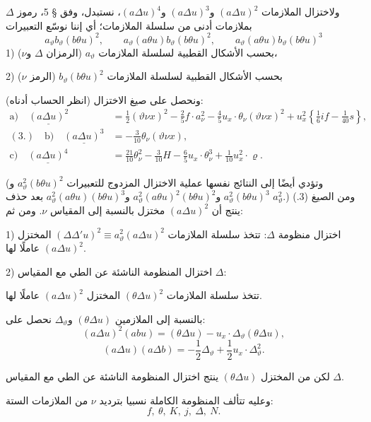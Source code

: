 \documentclass[11pt]{article}
\providecommand{\A}{\Delta}
\begin{document}
ولاختزال الملازمات $(a\Delta u)^2$ و$(a\Delta u)^3$ و$(a\Delta u)^4$، نستبدل، وفق § 5، رموز $\Delta$ بملازمات أدنى من سلسلة الملازمات؛ أي إننا نوسّع التعبيرات
\[
a_\vartheta b_\vartheta(b\theta u)^2,
\qquad a_\vartheta(a\theta u)b_\vartheta(b\theta u)^2,
\qquad a_\vartheta(a\theta u)b_\vartheta(b\theta u)^3
\]
1) بحسب الأشكال القطبية لسلسلة الملازمات $a_\vartheta$ (الرمزان $\Delta$ و$\nu$)،

2) بحسب الأشكال القطبية لسلسلة الملازمات $b_\vartheta(b\theta u)^2$ (الرمز $\nu$)

ونحصل على صيغ الاختزال (انظر الحساب أدناه):
\[
\begin{aligned}
\text{a)}\quad \underline{(a\Delta u)^2}
&=\frac12(\vartheta \nu x)^2-\frac25f\cdot a_\nu^2
-\frac45u_x\cdot\theta_\nu(\vartheta \nu x)^2
+u_x^2\left\{\frac16i f-\frac1{40}s\right\},\\
(3.)\quad\text{b)}\quad \underline{(a\Delta u)^3}
&=-\frac3{10}\theta_\nu(\vartheta \nu x),\\
\text{c)}\quad \underline{(a\Delta u)^4}
&=\frac{21}{10}\theta_\nu^2-\frac3{10}H
-\frac65u_x\cdot\theta_\nu^3+\frac1{10}u_x^2\cdot\varrho.
\end{aligned}
\]

(وتؤدي أيضًا إلى النتائج نفسها عملية الاختزال المزدوج للتعبيرات $a_\vartheta^2(b\theta u)^2$ و$a_\vartheta^2(b\theta u)^3$ و$a_\vartheta^2(a\theta u)^2(b\theta u)^2$ و$a_\vartheta^2(a\theta u)(b\theta u)^3$ بعد حذف $a_\vartheta^2$.)
ومن الصيغ (3.) ينتج أن $(a\Delta u)^2$ مختزل بالنسبة إلى المقياس $\nu$. ومن ثم:

1) اختزال منظومة $\Delta$: تتخذ سلسلة الملازمات $(\Delta\Delta' u)^2\equiv a_\vartheta^2(a\Delta u)^2$ المختزل $(a\Delta u)^2$ عاملًا لها.

2) اختزال المنظومة الناشئة عن الطي مع المقياس $\Delta$:

تتخذ سلسلة الملازمات $(\theta\Delta u)^2$ المختزل $(a\Delta u)^2$ عاملًا لها.

بالنسبة إلى الملازمين $(\theta\Delta u)$ و$\Delta_\vartheta$ نحصل على:
\[
(a\Delta u)^2(abu)=(\theta\Delta u)-u_x\cdot\Delta_\vartheta(\theta\Delta u),
\]
\[
(a\Delta u)(a\Delta b)=-\frac12\Delta_\vartheta+\frac12u_x\cdot\Delta_\vartheta^2.
\]

لكن من المختزل $(\theta\Delta u)$ ينتج اختزال المنظومة الناشئة عن الطي مع المقياس $\Delta$.

\bigskip

وعليه تتألف المنظومة الكاملة نسبيا بترديد $\nu$ من الملازمات الستة:
\[
f,\ \theta,\ K,\ j,\ \A,\ N.
\]
\end{document}
